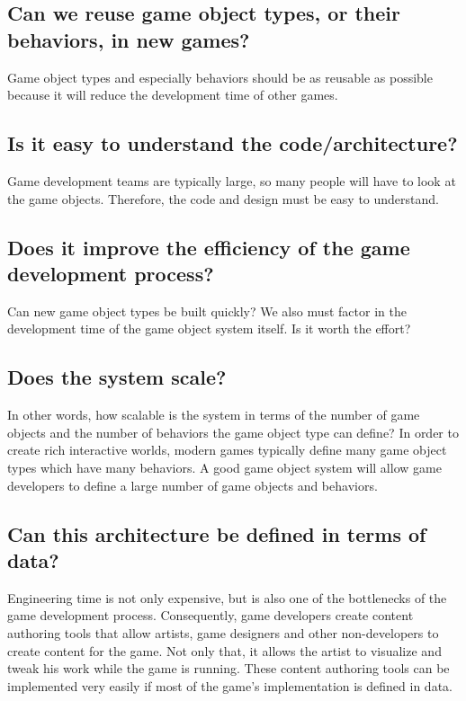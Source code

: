\documentclass[
    phd,
    electronic,
    letterpaper,
    simplechapterheading,
    openany,
    parttop,
    lof,
]{byumsphd}
\begin{document}
\subsection{Can we reuse game object types, or their behaviors, in new games?}

Game object types and especially behaviors should be as reusable as possible because it will reduce the development time of other games.


\subsection{Is it easy to understand the code/architecture?}

Game development teams are typically large, so many people will have to look at the game objects. Therefore, the code and design must be easy to understand.


\subsection{Does it improve the efficiency of the game development process?}

Can new game object types be built quickly? We also must factor in the development time of the game object system itself. Is it worth the effort?


\subsection{Does the system scale?}

 In other words, how scalable is the system in terms of the number of game objects and the number of behaviors the game object type can define? In order to create rich interactive worlds, modern games typically define many game object types which have many behaviors. A good game object system will allow game developers to define a large number of game objects and behaviors.


\subsection{Can this architecture be defined in terms of data?}

Engineering time is not only expensive, but is also one of the bottlenecks of the game development process. Consequently, game developers create content authoring tools that allow artists, game designers and other non-developers to create content for the game. Not only that, it allows the artist to visualize and tweak his work while the game is running. These content authoring tools can be implemented very easily if most of the game's implementation is defined in data.
\end{document}
